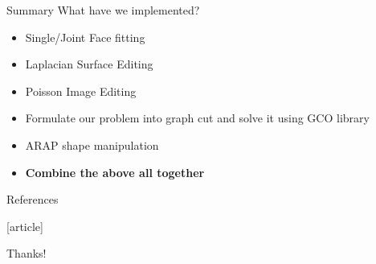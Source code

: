 \documentclass{beamer}
\begin{document}
\begin{frame}{Summary}
What have we implemented?
\begin{itemize}
\item Single/Joint Face fitting \cite{yang2011expression}
\item Laplacian Surface Editing \cite{sorkine2004laplacian}
\item Poisson Image Editing \cite{perez2003poisson}
\item Formulate our problem into graph cut\cite{yang2011expression} and solve it using GCO library \cite{boykov2004experimental}
\item ARAP shape manipulation \cite{igarashi2005rigid}
\item \textbf{Combine the above all together}
\end{itemize}
\end{frame}

\begin{frame}[allowframebreaks]{References}

[article]

\end{frame}

\begin{frame}
\begin{center}
\Huge Thanks!
\end{center}
\end{frame}
\end{document}
